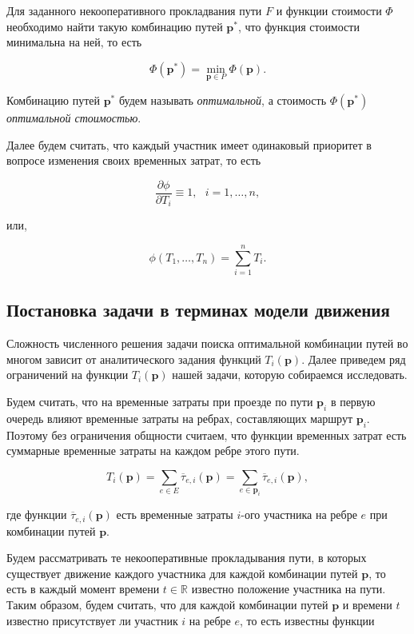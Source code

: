 \documentclass[12pt, a4paper]{article}
\DeclareMathOperator*{\minn}{min}
\begin{document}
Для заданного некооперативного прокладвания пути $F$ и функции стоимости $\Phi$ необходимо найти такую комбинацию путей $\textbf{p}^*$, что функция стоимости минимальна на ней, то есть

\begin{equation}
	\label{eq:target_global_task_T} 
	\Phi (\textbf{p}^*) = \minn\limits_{ \textbf{p} \in P} \Phi (\textbf{p}).
\end{equation}

Комбинацию путей $\textbf{p}^*$ будем называть \textit {оптимальной}, а стоимость  $ \Phi (\textbf{p}^*)$ \textit {оптимальной стоимостью}.

Далее будем считать, что каждый участник имеет одинаковый приоритет в вопросе изменения своих временных затрат, то есть 

\begin{equation}
	\frac{\partial \phi}{\partial T_i} \equiv 1, \text{ } i = 1, \ldots, n,
\end{equation}

или, 

\begin{equation}
\phi(T_1, \ldots, T_n) = \sum\limits_{i = 1}^nT_i.
\end{equation}

\subsection{Постановка задачи в терминах модели движения}

Сложность численного решения задачи поиска оптимальной комбинации путей во многом зависит от аналитического задания функций $T_i (\textbf{p})$. Далее приведем ряд ограничений на функции $T_i (\textbf{p})$ нашей задачи, которую собираемся исследовать.

Будем считать, что на временные затраты при проезде по пути $\textbf{p}_i$ в первую очередь влияют временные затраты на ребрах, составляющих маршрут $\textbf{p}_i$. Поэтому без ограничения общности считаем, что функции временных затрат есть суммарные временные затраты на каждом ребре этого пути.

$$T_i (\textbf{p}) = \sum \limits_{e \in E} \overline{\tau}_{e, i} (\textbf{p}) = \sum \limits_{e \in \textbf{p}_i} \overline{\tau}_{e, i} (\textbf{p}), $$

где функции $\overline{\tau}_{e, i} (\textbf{p})$ есть временные затраты $i$-ого участника на ребре $e$ при комбинации путей $\textbf{p}$. 

Будем рассматривать те некооперативные прокладывания пути, в которых существует движение каждого участника для каждой комбинации путей $\textbf{p}$, то есть в каждый момент времени $t \in \mathbb{R}$ известно положение участника на пути. Таким образом, будем считать, что для каждой комбинации путей $\textbf{p}$ и времени $t$ известно присутствует ли участник $i$ на ребре $e$, то есть известны функции
\end{document}
